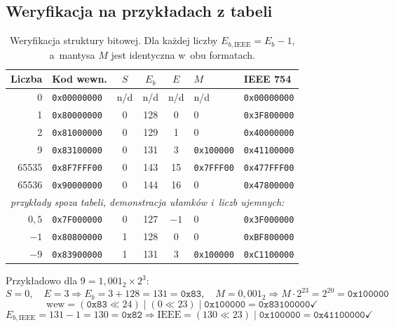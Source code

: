 \documentclass[12pt,a4paper]{article}
\begin{document}
\subsection*{Weryfikacja na przykładach z tabeli}

\begin{table}[H]
\centering
\small
\begin{tabular}{rlcccll}
\toprule
\textbf{Liczba} & \textbf{Kod wewn.} & $S$ & $E_b$ & $E$ & $M$ & \textbf{IEEE 754}\\
\midrule
0       & \texttt{0x00000000} & n/d & n/d & n/d & n/d & \texttt{0x00000000}\\
1       & \texttt{0x80000000} & 0  & 128 & 0   & 0                 & \texttt{0x3F800000}\\
2       & \texttt{0x81000000} & 0  & 129 & 1   & 0                 & \texttt{0x40000000}\\
9       & \texttt{0x83100000} & 0  & 131 & 3   & \texttt{0x100000} & \texttt{0x41100000}\\
65535   & \texttt{0x8F7FFF00} & 0  & 143 & 15  & \texttt{0x7FFF00} & \texttt{0x477FFF00}\\
65536   & \texttt{0x90000000} & 0  & 144 & 16  & 0                 & \texttt{0x47800000}\\
\midrule
\multicolumn{7}{l}{\textit{przykłady spoza tabeli, demonstracja ułamków i~liczb ujemnych:}}\\
$0{,}5$ & \texttt{0x7F000000} & 0  & 127 & $-1$ & 0                & \texttt{0x3F000000}\\
$-1$    & \texttt{0x80800000} & 1  & 128 & 0   & 0                 & \texttt{0xBF800000}\\
$-9$    & \texttt{0x83900000} & 1  & 131 & 3   & \texttt{0x100000} & \texttt{0xC1100000}\\
\bottomrule
\end{tabular}
\caption{Weryfikacja struktury bitowej. Dla każdej liczby
         $E_{b,\text{IEEE}} = E_b - 1$, a~mantysa $M$ jest identyczna w~obu formatach.}
\end{table}

\noindent Przykładowo dla $9 = 1{,}001_2 \times 2^3$:
\[
  S = 0,\quad E = 3 \Rightarrow E_b = 3 + 128 = 131 = \texttt{0x83},\quad
  M = 0{,}001_2 \Rightarrow M \cdot 2^{23} = 2^{20} = \texttt{0x100000}
\]
\[
  \text{wew} = (\texttt{0x83} \ll 24) \mid (0 \ll 23) \mid \texttt{0x100000}
  = \texttt{0x83100000} \checkmark
\]
\[
  E_{b,\text{IEEE}} = 131 - 1 = 130 = \texttt{0x82} \Rightarrow
  \text{IEEE} = (130 \ll 23) \mid \texttt{0x100000} = \texttt{0x41100000} \checkmark
\]
\end{document}
